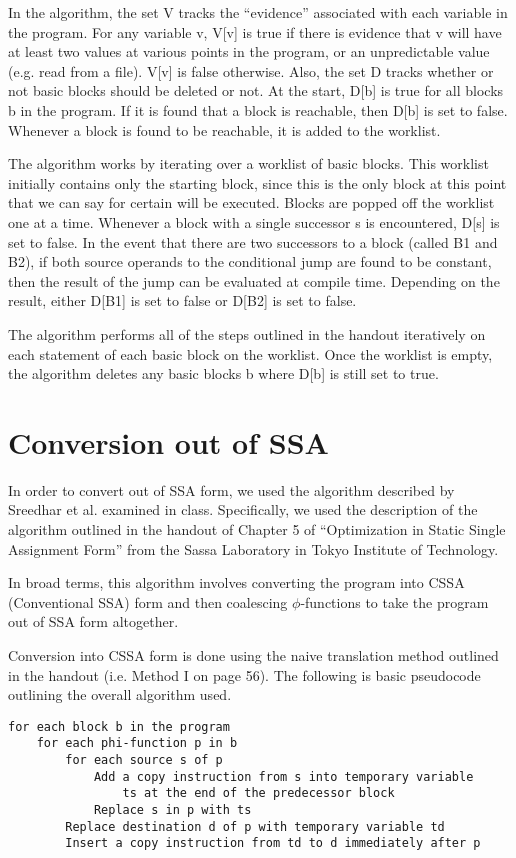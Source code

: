 \documentclass[a4paper,10pt]{report}
\begin{document}
In the algorithm, the set V tracks the ``evidence'' associated with each variable in the program. For any variable v,
V[v] is true if there is evidence that v will have at least two values at various points in the program, or an unpredictable
value (e.g. read from a file). V[v] is false otherwise. Also, the set D tracks whether or not basic blocks should be deleted or 
not. At the start, D[b] is true for all blocks b in the program. If it is found that a block is reachable, then D[b] is set to false.
Whenever a block is found to be reachable, it is added to the worklist.

The algorithm works by iterating over a worklist of basic blocks. This worklist initially contains only the starting block,
since this is the only block at this point that we can say for certain will be executed. Blocks are popped off the worklist
one at a time. Whenever a block with a single successor s is encountered, D[s] is set to false. In the event that there are two
successors to a block (called B1 and B2), if both source operands to the conditional jump are found to be constant, then the result 
of the jump can be evaluated at compile time. Depending on the result, either D[B1] is set to false or D[B2] is set to false.

The algorithm performs all of the steps outlined in the handout iteratively on each statement of each basic block on the worklist.
Once the worklist is empty, the algorithm deletes any basic blocks b where D[b] is still set to true.

\section{Conversion out of SSA}
In order to convert out of SSA form, we used the algorithm described by Sreedhar et al. examined in class. Specifically, we used 
the description of the algorithm outlined in the handout of Chapter 5 of ``Optimization in Static Single Assignment Form'' from 
the Sassa Laboratory in Tokyo Institute of Technology.

In broad terms, this algorithm involves converting the program into CSSA (Conventional SSA) form and then
coalescing \(\phi\)-functions to take the program out of SSA form altogether.

Conversion into CSSA form is done using the naive translation method outlined in the handout (i.e. Method I on page 56).
The following is basic pseudocode outlining the overall algorithm used.

\begin{verbatim}
for each block b in the program
    for each phi-function p in b
        for each source s of p
            Add a copy instruction from s into temporary variable 
                ts at the end of the predecessor block
            Replace s in p with ts
        Replace destination d of p with temporary variable td
        Insert a copy instruction from td to d immediately after p
\end{verbatim}
\end{document}
